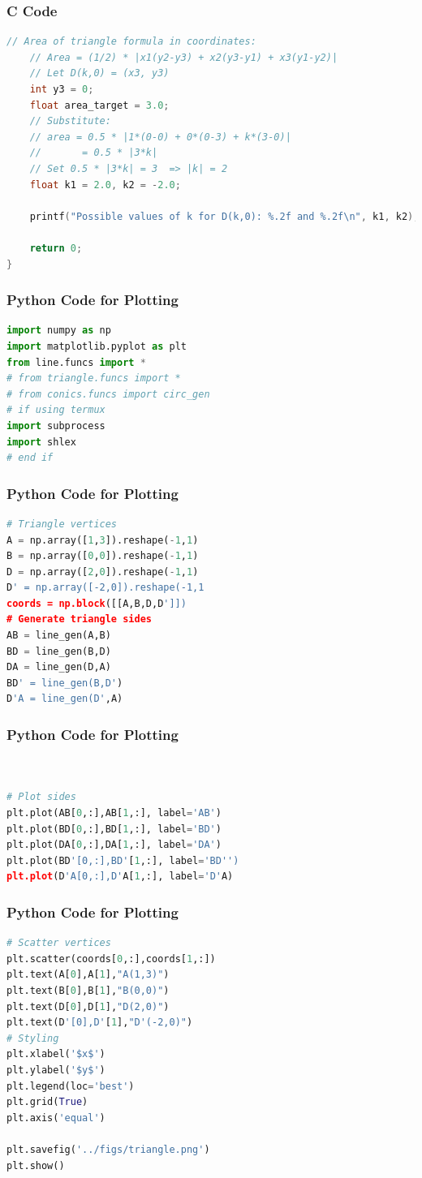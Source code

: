 \documentclass{beamer}
\theoremstyle{remark}
\numberwithin{equation}{section}
\begin{document}
\begin{frame}[fragile]
\frametitle{C Code }
\begin{lstlisting}[language=C]
        // Area of triangle formula in coordinates:
    // Area = (1/2) * |x1(y2-y3) + x2(y3-y1) + x3(y1-y2)|
    // Let D(k,0) = (x3, y3)
    int y3 = 0;
    float area_target = 3.0;
    // Substitute:
    // area = 0.5 * |1*(0-0) + 0*(0-3) + k*(3-0)|
    //       = 0.5 * |3*k|
    // Set 0.5 * |3*k| = 3  => |k| = 2
    float k1 = 2.0, k2 = -2.0;

    printf("Possible values of k for D(k,0): %.2f and %.2f\n", k1, k2);

    return 0;
}
\end{lstlisting}
\end{frame}
\begin{frame}[fragile]
\frametitle{Python Code for Plotting}
\begin{lstlisting}[language=Python]
import numpy as np
import matplotlib.pyplot as plt
from line.funcs import *
# from triangle.funcs import *
# from conics.funcs import circ_gen
# if using termux
import subprocess
import shlex
# end if

\end{lstlisting}

\end{frame}

\begin{frame}[fragile]
\frametitle{Python Code for Plotting}
\begin{lstlisting}[language=Python]
# Triangle vertices
A = np.array([1,3]).reshape(-1,1)
B = np.array([0,0]).reshape(-1,1)
D = np.array([2,0]).reshape(-1,1)
D' = np.array([-2,0]).reshape(-1,1
coords = np.block([[A,B,D,D']])
# Generate triangle sides
AB = line_gen(A,B)
BD = line_gen(B,D)
DA = line_gen(D,A)
BD' = line_gen(B,D')
D'A = line_gen(D',A)
\end{lstlisting}

\end{frame}
\begin{frame}[fragile]
\frametitle{Python Code for Plotting}
\begin{lstlisting}[language=Python]


# Plot sides
plt.plot(AB[0,:],AB[1,:], label='AB')
plt.plot(BD[0,:],BD[1,:], label='BD')
plt.plot(DA[0,:],DA[1,:], label='DA')
plt.plot(BD'[0,:],BD'[1,:], label='BD'')
plt.plot(D'A[0,:],D'A[1,:], label='D'A)
\end{lstlisting}

\end{frame}
\begin{frame}[fragile]
\frametitle{Python Code for Plotting}
\begin{lstlisting}[language=Python]
# Scatter vertices
plt.scatter(coords[0,:],coords[1,:])
plt.text(A[0],A[1],"A(1,3)")
plt.text(B[0],B[1],"B(0,0)")
plt.text(D[0],D[1],"D(2,0)")
plt.text(D'[0],D'[1],"D'(-2,0)")
# Styling
plt.xlabel('$x$')
plt.ylabel('$y$')
plt.legend(loc='best')
plt.grid(True)
plt.axis('equal')

plt.savefig('../figs/triangle.png')
plt.show()

\end{lstlisting}

\end{frame}
\end{document}

